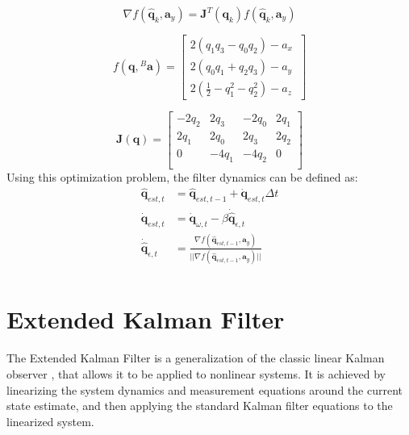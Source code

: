 \begin{equation}
	\nabla f(\hat{\boldsymbol{q}}_{k}, \boldsymbol{a}_y) = \boldsymbol{J}^T(\boldsymbol{q}_{k}) f(\hat{\boldsymbol{q}}_{k}, \boldsymbol{a}_y)
\end{equation}

\begin{equation}
	f(\boldsymbol{q}, {}^B\boldsymbol{a}) = \begin{bmatrix}
		2(q_1q_3 - q_0q_2) - a_{x} \\
		2(q_0q_1 + q_2q_3) - a_{y} \\
		2(\frac{1}{2} - q_1^2 - q_2^2) - a_{z}\
	\end{bmatrix}
\end{equation}

\begin{equation}
	\boldsymbol{J}(\boldsymbol{q}) = \begin{bmatrix}
		-2q_2 & 2q_3  & -2q_0 & 2q_1 \\
		2q_1  & 2q_0  & 2q_3  & 2q_2 \\
		0     & -4q_1 & -4q_2 & 0    \\
	\end{bmatrix}
\end{equation}
Using this optimization problem, the filter dynamics can be defined as:
\begin{equation}
	\begin{aligned}
		\hat{\boldsymbol{q}}_{est,t}             & = \hat{\boldsymbol{q}}_{est,t-1} + \dot{\boldsymbol{q}}_{est,t}\Delta t                                                                \\
		\dot{\boldsymbol{q}}_{est,t}             & = \dot{\boldsymbol{q}}_{\omega,t} - \beta \dot{\hat{\boldsymbol{q}}}_{\epsilon, t}                                                     \\
		\dot{\hat{\boldsymbol{q}}}_{\epsilon, t} & = \frac{\nabla f(\hat{\boldsymbol{q}}_{est,t- 1}, \boldsymbol{a}_y)}{||\nabla f(\hat{\boldsymbol{q}}_{est,t - 1}, \boldsymbol{a}_y)||} \\
	\end{aligned}
\end{equation}

\newpage
\section{Extended Kalman Filter}

The Extended Kalman Filter is a generalization of the classic linear Kalman observer \cite{Kalman1960ANeA}, that allows it to be applied to nonlinear systems. It is achieved by linearizing the system dynamics and measurement equations around the current state estimate, and then applying the standard Kalman filter equations to the linearized system.

